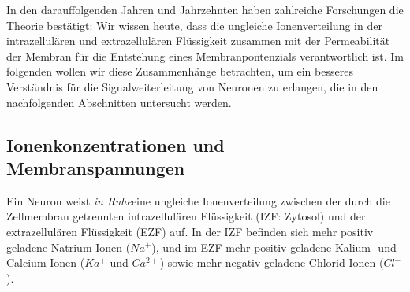 In den darauffolgenden Jahren und Jahrzehnten haben zahlreiche Forschungen die Theorie bestätigt: Wir wissen heute, dass die ungleiche Ionenverteilung in der intrazellulären und extrazellulären Flüssigkeit zusammen mit der Permeabilität der Membran für die Entstehung eines Membranpontenzials verantwortlich ist. Im folgenden wollen wir diese Zusammenhänge betrachten, um ein besseres Verständnis für die Signalweiterleitung von Neuronen zu erlangen, die in den nachfolgenden Abschnitten untersucht werden.



\subsection{Ionenkonzentrationen und Membranspannungen}

Ein Neuron weist \textit{in Ruhe}\footnotemark[19] eine ungleiche Ionenverteilung zwischen der durch die Zellmembran getrennten intrazellulären Flüssigkeit (IZF: Zytosol) und der extrazellulären Flüssigkeit (EZF) auf.
In der IZF befinden sich mehr positiv geladene Natrium-Ionen ($Na^+$), und im EZF mehr positiv geladene Kalium- und Calcium-Ionen ($Ka^+$ und $Ca^{2+}$) sowie mehr negativ geladene Chlorid-Ionen ($Cl^-$).


